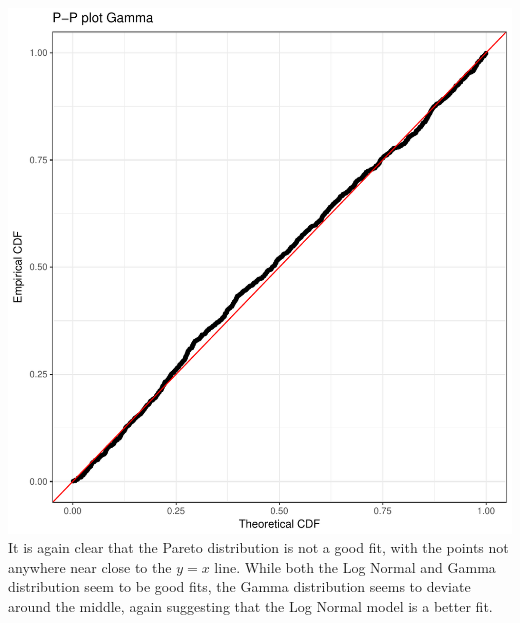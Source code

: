 \documentclass[titlepage]{article}
\begin{document}
		\includegraphics[scale=0.3]{PP_gamma}\\
	It is again clear that the Pareto distribution is not a good fit, with the points not anywhere near close to the $y=x$ line. While both the Log Normal and Gamma distribution seem to be good fits, the Gamma distribution seems to deviate around the middle, again suggesting that the Log Normal model is a better fit.
	
\end{document}
